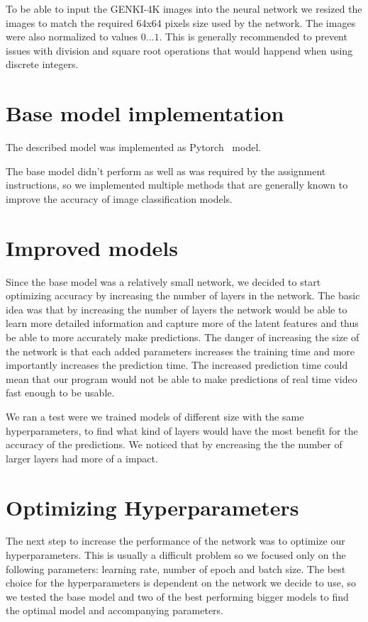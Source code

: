 \documentclass[12pt,a4paper,english
]{tunithesis}
\begin{document}
To be able to input the GENKI-4K images into the neural network we resized the images to match the required 64x64 pixels size used by the network. The images were also normalized to values $0...1$. This is generally recommended to prevent issues with division and square root operations that would happend when using discrete integers.


\section{Base model implementation}
The described model was implemented as Pytorch~\cite{pytorch} model.

The base model didn't perform as well as was required by the assignment instructions, so we implemented multiple methods that are generally known to improve the accuracy of image classification models.

\section{Improved models}
Since the base model was a relatively small network, we decided to start optimizing accuracy by increasing the number of layers in the network. The basic idea was that by increasing the number of layers the network would be able to learn more detailed information and capture more of the latent features and thus be able to more accurately make predictions. The danger of increasing the size of the network is that each added parameters increases the training time and more importantly increases the prediction time. The increased prediction time could mean that our program would not be able to make predictions of real time video fast enough to be usable.

We ran a test were we trained models of different size with the same hyperparameters, to find what kind of layers would have the most benefit for the accuracy of the predictions. We noticed that by encreasing the the number of larger layers had more of a impact.

\section{Optimizing Hyperparameters}
The next step to increase the performance of the network was to optimize our hyperparameters. This is usually a difficult problem so we focused only on the following parameters: learning rate, number of epoch and batch size. The best choice for the hyperparameters is dependent on the network we decide to use, so we tested the base model and two of the best performing bigger models to find the optimal model and accompanying parameters.
\end{document}
